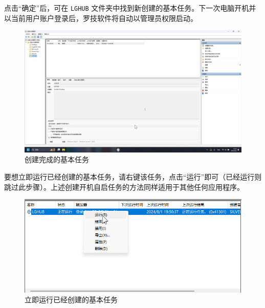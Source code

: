 点击“确定”后，可在 \lstinline{LGHUB} 文件夹中找到新创建的基本任务。下一次电脑开机并以当前用户账户登录后，罗技软件将自动以管理员权限启动。

\begin{figure}[H]
    \Centering
    \includegraphics[width=\textwidth]{docs/assets/skills/create_basic_task_10.png}
    \caption{创建完成的基本任务}
\end{figure}

要想立即运行已经创建的基本任务，请右键该任务，点击“运行”即可（已经运行则跳过此步骤）。上述创建开机自启任务的方法同样适用于其他任何应用程序。

\begin{figure}[H]
    \Centering
    \includegraphics[width=\textwidth]{docs/assets/skills/run_task.png}
    \caption{立即运行已经创建的基本任务}
\end{figure}
